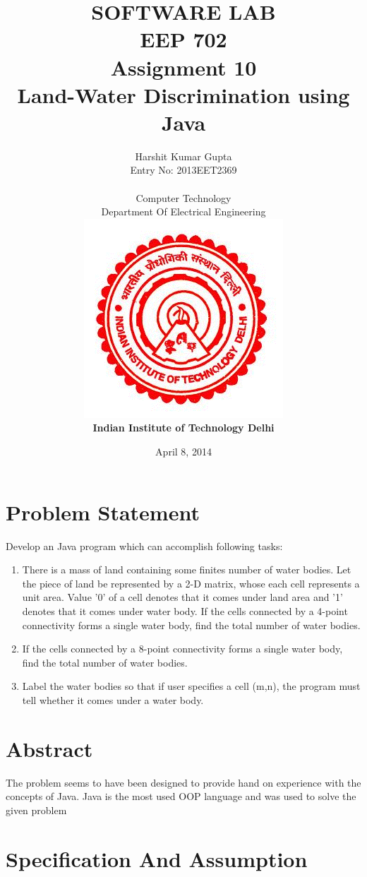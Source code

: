 \documentclass [12 pt ]{article}
\title{\textbf{\huge{SOFTWARE LAB\\[0.5 cm]EEP 702}\\[1.5 cm] Assignment 10\\[0.5cm]Land-Water Discrimination using Java\\[0.5 cm]}}%
\author{ {Harshit Kumar Gupta} \\Entry No: 2013EET2369\\[0.4 cm] \\[0.4cm] Computer Technology\\ Department Of Electrical Engineering\\[1cm]
\includegraphics[scale = 0.4]{IITD.png}
\\[0.5 cm] \textbf{Indian Institute of Technology Delhi}}
\date{April 8, 2014}
\begin{document}
\maketitle
\newpage
\tableofcontents
\newpage 

 \section{Problem Statement}
 Develop an Java program which can accomplish following tasks:   
\begin{enumerate}

\item There is a mass of land containing some finites number of water bodies. Let the piece of land be represented by a 2-D matrix, whose each cell
represents a unit area. Value '0' of a cell denotes that it comes under land area and '1' denotes that it comes under water body.
If the cells connected by a 4-point connectivity forms a single water body, find the total number of water bodies.


\item If the cells connected by a 8-point connectivity forms a single water body, find the total number of water bodies.


\item Label the water bodies so that if user specifies a cell (m,n), the program must tell whether it
comes under a water body.


\end{enumerate}
    
 \newpage
 
\section {Abstract}
The problem seems to have been designed to provide hand on experience with the concepts of Java. Java is the most used OOP language and was used to
solve the given problem






\newpage
 \section{Specification And Assumption}
\end{document}
